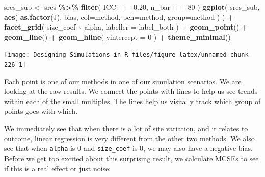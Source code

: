 \documentclass[
]{book}
\newenvironment{Shaded}{\begin{snugshade}}{\end{snugshade}}
\newcommand{\AttributeTok}[1]{\textcolor[rgb]{0.13,0.29,0.53}{#1}}
\newcommand{\DecValTok}[1]{\textcolor[rgb]{0.00,0.00,0.81}{#1}}
\newcommand{\FloatTok}[1]{\textcolor[rgb]{0.00,0.00,0.81}{#1}}
\newcommand{\FunctionTok}[1]{\textcolor[rgb]{0.13,0.29,0.53}{\textbf{#1}}}
\newcommand{\NormalTok}[1]{#1}
\newcommand{\OtherTok}[1]{\textcolor[rgb]{0.56,0.35,0.01}{#1}}
\newcommand{\SpecialCharTok}[1]{\textcolor[rgb]{0.81,0.36,0.00}{\textbf{#1}}}
\begin{document}
\begin{Shaded}
\begin{Highlighting}[]
\NormalTok{sres\_sub }\OtherTok{\textless{}{-}}\NormalTok{ sres }\SpecialCharTok{\%\textgreater{}\%}
  \FunctionTok{filter}\NormalTok{( ICC }\SpecialCharTok{==} \FloatTok{0.20}\NormalTok{, n\_bar }\SpecialCharTok{==} \DecValTok{80}\NormalTok{ )}
\FunctionTok{ggplot}\NormalTok{( sres\_sub, }\FunctionTok{aes}\NormalTok{( }\FunctionTok{as.factor}\NormalTok{(J), bias, }
                       \AttributeTok{col=}\NormalTok{method, }\AttributeTok{pch=}\NormalTok{method, }\AttributeTok{group=}\NormalTok{method ) ) }\SpecialCharTok{+}
  \FunctionTok{facet\_grid}\NormalTok{( size\_coef }\SpecialCharTok{\textasciitilde{}}\NormalTok{ alpha, }\AttributeTok{labeller =}\NormalTok{ label\_both ) }\SpecialCharTok{+}
  \FunctionTok{geom\_point}\NormalTok{() }\SpecialCharTok{+} \FunctionTok{geom\_line}\NormalTok{() }\SpecialCharTok{+}
  \FunctionTok{geom\_hline}\NormalTok{( }\AttributeTok{yintercept =} \DecValTok{0}\NormalTok{ ) }\SpecialCharTok{+}
  \FunctionTok{theme\_minimal}\NormalTok{() }
\end{Highlighting}
\end{Shaded}

\begin{center}\texttt{[image: Designing-Simulations-in-R\_files/figure-latex/unnamed-chunk-226-1]} \end{center}

Each point is one of our methods in one of our simulation scenarios.
We are looking at the raw results.
We connect the points with lines to help us see trends within each of the small multiples.
The lines help us visually track which group of points goes with which.

We immediately see that when there is a lot of site variation, and it relates to outcome, linear regression is very different from the other two methods.
We also see that when \texttt{alpha} is 0 and \texttt{size\_coef} is 0, we may also have a negative bias.
Before we get too excited about this surprising result, we calculate MCSEs to see if this is a real effect or just noise:
\end{document}
